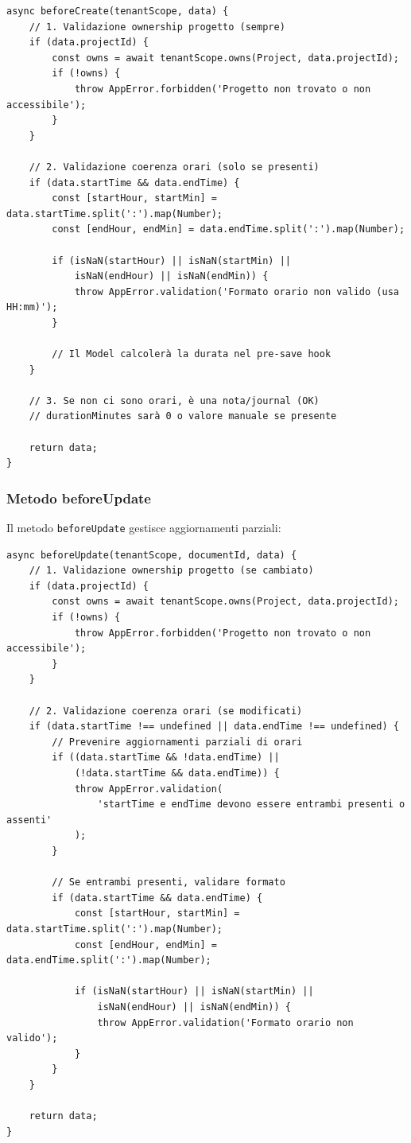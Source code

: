 \documentclass[11pt,a4paper]{article}
\begin{document}
\begin{lstlisting}[caption=beforeCreate Ibrido]
async beforeCreate(tenantScope, data) {
    // 1. Validazione ownership progetto (sempre)
    if (data.projectId) {
        const owns = await tenantScope.owns(Project, data.projectId);
        if (!owns) {
            throw AppError.forbidden('Progetto non trovato o non accessibile');
        }
    }
    
    // 2. Validazione coerenza orari (solo se presenti)
    if (data.startTime && data.endTime) {
        const [startHour, startMin] = data.startTime.split(':').map(Number);
        const [endHour, endMin] = data.endTime.split(':').map(Number);
        
        if (isNaN(startHour) || isNaN(startMin) || 
            isNaN(endHour) || isNaN(endMin)) {
            throw AppError.validation('Formato orario non valido (usa HH:mm)');
        }
        
        // Il Model calcolerà la durata nel pre-save hook
    }
    
    // 3. Se non ci sono orari, è una nota/journal (OK)
    // durationMinutes sarà 0 o valore manuale se presente
    
    return data;
}
\end{lstlisting}

\subsubsection{Metodo beforeUpdate}

Il metodo \texttt{beforeUpdate} gestisce aggiornamenti parziali:

\begin{lstlisting}[caption=beforeUpdate Ibrido]
async beforeUpdate(tenantScope, documentId, data) {
    // 1. Validazione ownership progetto (se cambiato)
    if (data.projectId) {
        const owns = await tenantScope.owns(Project, data.projectId);
        if (!owns) {
            throw AppError.forbidden('Progetto non trovato o non accessibile');
        }
    }
    
    // 2. Validazione coerenza orari (se modificati)
    if (data.startTime !== undefined || data.endTime !== undefined) {
        // Prevenire aggiornamenti parziali di orari
        if ((data.startTime && !data.endTime) || 
            (!data.startTime && data.endTime)) {
            throw AppError.validation(
                'startTime e endTime devono essere entrambi presenti o assenti'
            );
        }
        
        // Se entrambi presenti, validare formato
        if (data.startTime && data.endTime) {
            const [startHour, startMin] = data.startTime.split(':').map(Number);
            const [endHour, endMin] = data.endTime.split(':').map(Number);
            
            if (isNaN(startHour) || isNaN(startMin) || 
                isNaN(endHour) || isNaN(endMin)) {
                throw AppError.validation('Formato orario non valido');
            }
        }
    }
    
    return data;
}
\end{lstlisting}
\end{document}
